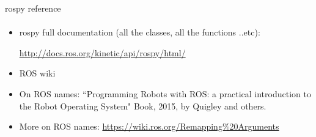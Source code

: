 \documentclass{beamer}
\begin{document}
    

\begin{frame}[fragile]{rospy reference}
    \framesubtitle{}

\begin{itemize}
    \item rospy full documentation (all the classes, all the functions ..etc):
    
    \vspace{0.5cm}
     \url{http://docs.ros.org/kinetic/api/rospy/html/}
     
    \item ROS wiki
    
    \item On ROS names: ``Programming Robots with ROS: a practical introduction to the Robot Operating System" Book, 2015, by Quigley and others.
    
    \item More on ROS names: \url{https://wiki.ros.org/Remapping%20Arguments}
\end{itemize}
    
\end{frame}
\end{document}

